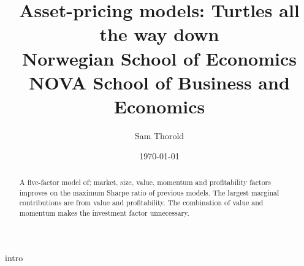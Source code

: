 \documentclass[a4paper, 12pt]{article}
\title{
  {Asset-pricing models: Turtles all the way down}\\
  {\large Norwegian School of Economics}\\
  {\large NOVA School of Business and Economics}
}
\author{Sam Thorold}
\date{\today}
\begin{document}
\maketitle

\begin{abstract}
  A five-factor model of; market, size,  value, momentum and profitability 
  factors improves on the maximum Sharpe ratio of previous models. The largest 
  marginal contributions are from value and profitability. The combination of 
  value and momentum makes the investment factor unnecessary.
\end{abstract}

{intro}


\printbibliography
\end{document}
